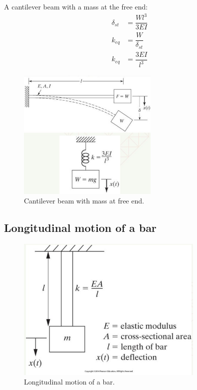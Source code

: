 A cantilever beam with a mass at the free end:
\begin{align}
    \delta_{st} & = \dfrac{Wl^3}{3EI}      \\
    k_{eq}      & = \dfrac{W}{\delta_{st}} \\
    k_{eq}      & = \dfrac{3EI}{l^3}
\end{align}
\begin{figure}[H]
    \centering
    \includegraphics[width = 0.6\textwidth]{./img/diagram18.jpg}
    \caption{Cantilever beam with mass at free end.}
\end{figure}
\subsection{Longitudinal motion of a bar}
\begin{figure}[H]
    \centering
    \includegraphics[width = 0.8\textwidth]{./img/diagram19.jpg}
    \caption{Longitudinal motion of a bar.}
\end{figure}
